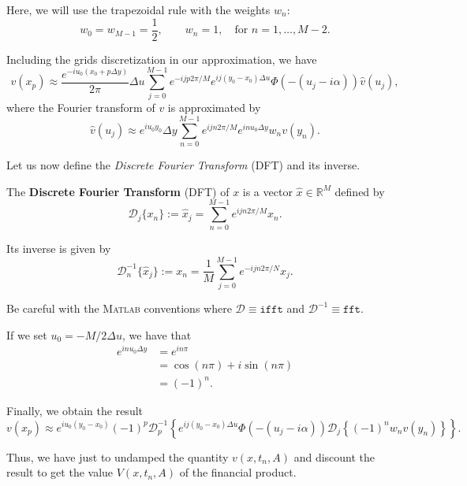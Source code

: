 Here, we will use the trapezoidal rule with the weights $w_n$:
$$w_0=w_{M-1} = \frac{1}{2},\qquad w_n = 1, \quad\text{for }n=1,\ldots,M-2.$$

Including the grids discretization in our approximation, we have
$$v(x_p) \approx\frac{e^{-iu_0(x_0+p\Delta y)}}{2\pi}\Delta u\sum_{j=0}^{M-1}e^{-ijp2\pi/M}e^{ij(y_0-x_0)\Delta u}\Phi(-(u_j-i\alpha))\hat{v}(u_j), $$
where the Fourier transform of $v$ is approximated by
$$\hat{v}(u_j) \approx e^{iu_0y_0}\Delta y \sum_{n=0}^{M-1}e^{ijn2\pi/M}e^{inu_0\Delta y}w_nv(y_n).$$

Let us now define the \textit{Discrete Fourier Transform} (DFT) and its inverse.
\begin{defn}
The \textbf{Discrete Fourier Transform} (DFT) of $x$ is a vector $\hat{x}\in\mathbb{R}^M$ defined by
$$\mathcal{D}_j\{x_n\} := \hat{x}_j = \sum_{n=0}^{M-1}e^{ijn2\pi/M}x_n.$$

Its inverse is given by
$$\mathcal{D}_n^{-1}\{\hat{x}_j\} := x_n =\frac{1}{M} \sum_{j=0}^{M-1}e^{-ijn2\pi/N}x_j.$$

Be careful with the \textsc{Matlab} conventions where $\mathcal{D} \equiv\texttt{ifft}$ and $\mathcal{D}^{-1}\equiv\texttt{fft}$.
\end{defn}

If we set $u_0 = -M/2\Delta u$, we have that
\begin{align*}
e^{inu_0\Delta y}&=e^{in\pi}\\
&=\cos(n\pi)+i\sin(n\pi)\\
&=(-1)^n.
\end{align*}

Finally, we obtain the result
$$v(x_p) \approx e^{iu_0(y_0-x_0)}(-1)^p\mathcal{D}_p^{-1}\left\{e^{ij(y_0-x_0)\Delta u}\Phi(-(u_j-i\alpha))\mathcal{D}_j\left\{(-1)^nw_nv(y_n)\right\}\right\}.$$

Thus, we have just to undamped the quantity $v(x,t_n,A)$ and discount the result to get the value $V(x,t_n,A)$ of the financial product.

